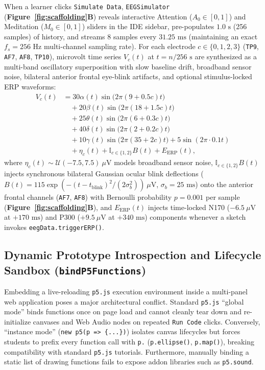 \documentclass[10pt,twocolumn]{article}
\begin{document}
When a learner clicks \texttt{Simulate Data}, \texttt{EEGSimulator} (\textbf{Figure~\ref{fig:scaffolding}B}) reveals interactive Attention ($A_0 \in [0,1]$) and Meditation ($M_0 \in [0,1]$) sliders in the IDE sidebar, pre-populates $1.0\text{ s}$ (256 samples) of history, and streams 8 samples every $31.25\text{ ms}$ (maintaining an exact $f_s = 256\text{ Hz}$ multi-channel sampling rate). For each electrode $c \in \{0,1,2,3\}$ (\texttt{TP9}, \texttt{AF7}, \texttt{AF8}, \texttt{TP10}), microvolt time series $V_c(t)$ at $t = n / 256\text{ s}$ are synthesized as a multi-band oscillatory superposition with slow baseline drift, broadband sensor noise, bilateral anterior frontal eye-blink artifacts, and optional stimulus-locked ERP waveforms:
\begin{align}
V_c(t) &= 30\alpha(t)\sin\!\big(2\pi(9 + 0.5c)t\big) \nonumber\\
&\quad + 20\beta(t)\sin\!\big(2\pi(18 + 1.5c)t\big) \nonumber\\
&\quad + 25\theta(t)\sin\!\big(2\pi(6 + 0.3c)t\big) \nonumber\\
&\quad + 40\delta(t)\sin\!\big(2\pi(2 + 0.2c)t\big) \nonumber\\
&\quad + 10\gamma(t)\sin\!\big(2\pi(35 + 2c)t\big) + 5\sin(2\pi \cdot 0.1t) \nonumber\\
&\quad + \eta_c(t) + \mathbb{I}_{c \in \{1,2\}} B(t) + E_{\text{ERP}}(t),
\end{align}
where $\eta_c(t) \sim \mathcal{U}(-7.5, 7.5)\ \mu\text{V}$ models broadband sensor noise, $\mathbb{I}_{c \in \{1,2\}} B(t)$ injects synchronous bilateral Gaussian ocular blink deflections ($B(t) = 115\exp(-(t - t_{\text{blink}})^2 / (2\sigma_b^2))\ \mu\text{V}$, $\sigma_b = 25\text{ ms}$) onto the anterior frontal channels (\texttt{AF7}, \texttt{AF8}) with Bernoulli probability $p = 0.001$ per sample (\textbf{Figure~\ref{fig:scaffolding}B}), and $E_{\text{ERP}}(t)$ injects time-locked N170 ($-6.5\ \mu\text{V}$ at $+170\text{ ms}$) and P300 ($+9.5\ \mu\text{V}$ at $+340\text{ ms}$) components whenever a sketch invokes \texttt{eegData.triggerERP()}.

\subsection{Dynamic Prototype Introspection and Lifecycle Sandbox (\texttt{bindP5Functions})}
Embedding a live-reloading \texttt{p5.js} execution environment inside a multi-panel web application poses a major architectural conflict. Standard \texttt{p5.js} ``global mode'' binds functions once on page load and cannot cleanly tear down and re-initialize canvases and Web Audio nodes on repeated \texttt{Run Code} clicks. Conversely, ``instance mode'' (\texttt{new p5(p => \{...\})}) isolates canvas lifecycles but forces students to prefix every function call with \texttt{p.} (\texttt{p.ellipse()}, \texttt{p.map()}), breaking compatibility with standard \texttt{p5.js} tutorials. Furthermore, manually binding a static list of drawing functions fails to expose addon libraries such as \texttt{p5.sound}.
\end{document}

